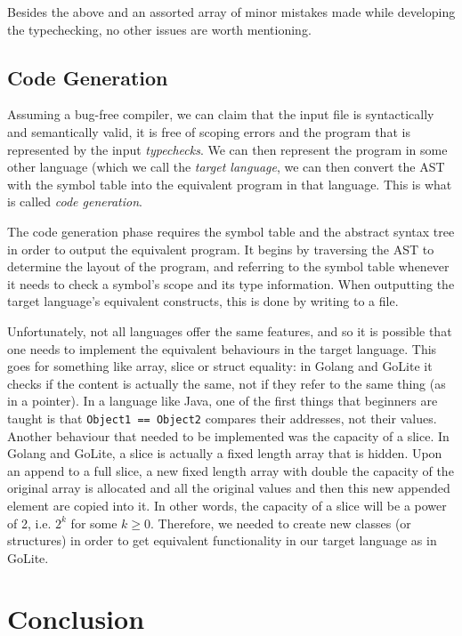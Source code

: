 \documentclass{article}
\begin{document}
Besides the above and an assorted array of minor mistakes made while developing the typechecking, no other issues are worth mentioning.

\subsection{Code Generation}

Assuming a bug-free compiler, we can claim that the input file is syntactically and semantically valid, it is free of scoping errors and the program that is represented by the input \textit{typechecks}. We can then represent the program in some other language (which we call the \textit{target language}, we can then convert the AST with the symbol table into the equivalent program in that language. This is what is called \textit{code generation}.

The code generation phase requires the symbol table and the abstract syntax tree in order to output the equivalent program. It begins by traversing the AST to determine the layout of the program, and referring to the symbol table whenever it needs to check a symbol's scope and its type information. When outputting the target language's equivalent constructs, this is done by writing to a file. 

Unfortunately, not all languages offer the same features, and so it is possible that one needs to implement the equivalent behaviours in the target language. This goes for something like array, slice or struct equality: in Golang and GoLite it checks if the content is actually the same, not if they refer to the same thing (as in a pointer). In a language like Java, one of the first things that beginners are taught is that \texttt{Object1 == Object2} compares their addresses, not their values. Another behaviour that needed to be implemented was the capacity of a slice. In Golang and GoLite, a slice is actually a fixed length array that is hidden. Upon an append to a full slice, a new fixed length array with double the capacity of the original array is allocated and all the original values and then this new appended element are copied into it. In other words, the capacity of a slice will be a power of 2, i.e. $2^k$ for some $k \geq 0$. Therefore, we needed to create new classes (or structures) in order to get equivalent functionality in our target language as in GoLite.

\section{Conclusion}
\end{document}
